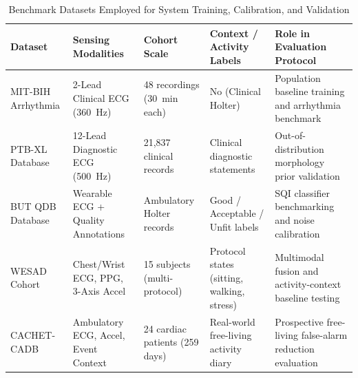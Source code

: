 \documentclass{ieeeaccess}
\begin{document}
\begin{table}[t]
\caption{Benchmark Datasets Employed for System Training, Calibration, and Validation}
\label{tab:datasets}
\centering
\scriptsize
\renewcommand{\arraystretch}{1.2}
\begin{tabularx}{\textwidth}{l p{} p{} p{} X}
\toprule
\textbf{Dataset} & \textbf{Sensing Modalities} & \textbf{Cohort Scale} & \textbf{Context / Activity Labels} & \textbf{Role in Evaluation Protocol} \\
\midrule
MIT-BIH Arrhythmia \cite{ref:annet} & 2-Lead Clinical ECG (360~Hz) & 48 recordings (30~min each) & No (Clinical Holter) & Population baseline training and arrhythmia benchmark \\
PTB-XL Database \cite{ref:ptbxl} & 12-Lead Diagnostic ECG (500~Hz) & 21,837 clinical records & Clinical diagnostic statements & Out-of-distribution morphology prior validation \\
BUT QDB Database \cite{ref:senecho} & Wearable ECG + Quality Annotations & Ambulatory Holter records & Good / Acceptable / Unfit labels & SQI classifier benchmarking and noise calibration \\
WESAD Cohort \cite{ref:wesad} & Chest/Wrist ECG, PPG, 3-Axis Accel & 15 subjects (multi-protocol) & Protocol states (sitting, walking, stress) & Multimodal fusion and activity-context baseline testing \\
CACHET-CADB \cite{ref:cachet} & Ambulatory ECG, Accel, Event Context & 24 cardiac patients (259 days) & Real-world free-living activity diary & Prospective free-living false-alarm reduction evaluation \\
\bottomrule
\end{tabularx}
\end{table}
\end{document}
